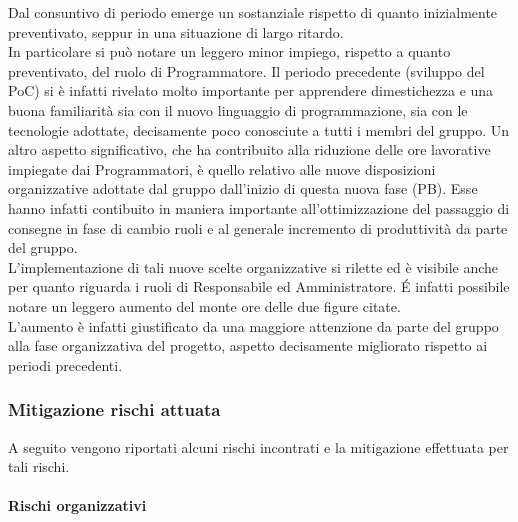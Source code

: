 Dal consuntivo di periodo emerge un sostanziale rispetto di quanto inizialmente preventivato, seppur in una situazione di largo ritardo. \\
In particolare si può notare un leggero minor impiego, rispetto a quanto preventivato, del ruolo di Programmatore. Il periodo precedente (sviluppo del PoC) si è infatti rivelato molto importante per apprendere dimestichezza e una buona familiarità sia con il nuovo linguaggio di programmazione, sia con le tecnologie adottate, decisamente poco conosciute a tutti i membri del gruppo. 
Un altro aspetto significativo, che ha contribuito alla riduzione delle ore lavorative impiegate dai Programmatori, è quello relativo alle nuove disposizioni organizzative adottate dal gruppo dall'inizio di questa nuova fase (PB). Esse hanno infatti contibuito in maniera importante all'ottimizzazione del passaggio di consegne in fase di cambio ruoli e al generale incremento di produttività da parte del gruppo.\\
L'implementazione di tali nuove scelte organizzative si rilette ed è visibile anche per quanto riguarda i ruoli di Responsabile ed Amministratore. É infatti possibile notare un leggero aumento del monte ore delle due figure citate.\\
L'aumento è infatti giustificato da una maggiore attenzione da parte del gruppo alla fase organizzativa del progetto, aspetto decisamente migliorato rispetto ai periodi precedenti. \\

\subsubsection{Mitigazione rischi attuata}\label{sec:consuntivo:codifica:mitigazione}

A seguito vengono riportati alcuni rischi incontrati e la mitigazione effettuata per tali rischi.\\

\paragraph{Rischi organizzativi}

